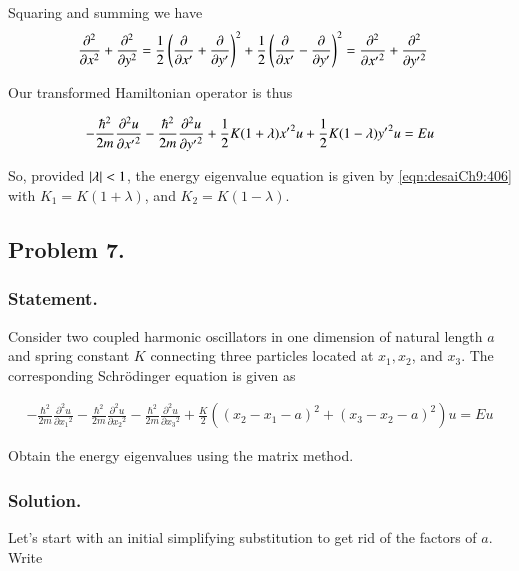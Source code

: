Squaring and summing we have
\begin{align}\label{eqn:desaiCh9:505}
\frac{\partial^2}{\partial x^2} +
\frac{\partial^2}{\partial y^2}
&=
\frac{1}{2} \left( \frac{\partial {}}{\partial {x'}} + \frac{\partial {}}{\partial {y'}} \right)^2
+\frac{1}{2} \left( \frac{\partial {}}{\partial {x'}} - \frac{\partial {}}{\partial {y'}} \right)^2
=
\frac{\partial^2}{\partial {x'}^2} +
\frac{\partial^2}{\partial {y'}^2}
\end{align}

Our transformed Hamiltonian operator is thus

\begin{align}\label{eqn:desaiCh9:506}
-\frac{\hbar^2}{2m} \frac{\partial^2 u}{\partial {x'}^2}
-\frac{\hbar^2}{2m} \frac{\partial^2 u}{\partial {y'}^2}
+ \frac{1}{2} K(1+\lambda) {x'}^2 u
+ \frac{1}{2} K(1-\lambda) {y'}^2 u
= E u
\end{align}

So, provided $\left\lvert{\lambda}\right\rvert < 1$, the energy eigenvalue equation is given by \ref{eqn:desaiCh9:406} with $K_1 = K(1+ \lambda)$, and $K_2 = K(1 -\lambda)$.

\subsection{Problem 7.}
\subsubsection{Statement.}

Consider two coupled harmonic oscillators in one dimension of natural length $a$ and spring constant $K$ connecting three particles located at $x_1, x_2$, and $x_3$.  The corresponding Schr\"{o}dinger equation is given as

\begin{align}\label{eqn:desaiCh9:700}
-\frac{\hbar^2}{2m} \frac{\partial^2 u}{\partial {x_1}^2}
-\frac{\hbar^2}{2m} \frac{\partial^2 u}{\partial {x_2}^2}
-\frac{\hbar^2}{2m} \frac{\partial^2 u}{\partial {x_3}^2}
+ \frac{K}{2}
\left(
(x_2 - x_1 - a)^2
+(x_3 - x_2 - a)^2
\right) u
= E u
\end{align}

Obtain the energy eigenvalues using the matrix method.

\subsubsection{Solution.}

Let's start with an initial simplifying substitution to get rid of the factors of $a$.  Write

